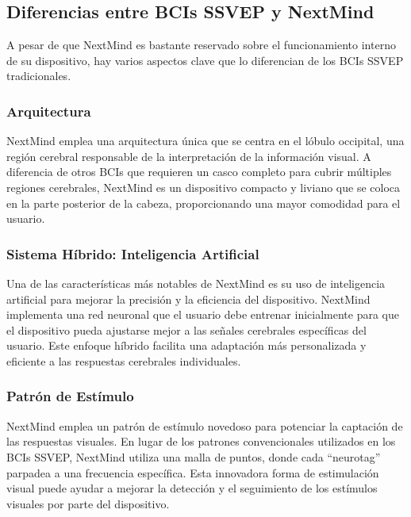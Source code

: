 \subsection{Diferencias entre BCIs SSVEP y NextMind}

A pesar de que NextMind es bastante reservado sobre el funcionamiento interno de su dispositivo, hay varios aspectos clave que lo diferencian de los BCIs SSVEP tradicionales.

\subsubsection{Arquitectura}

NextMind emplea una arquitectura única que se centra en el lóbulo occipital, una región cerebral responsable de la interpretación de la información visual. A diferencia de otros BCIs que requieren un casco completo para cubrir múltiples regiones cerebrales, NextMind es un dispositivo compacto y liviano que se coloca en la parte posterior de la cabeza, proporcionando una mayor comodidad para el usuario.

\subsubsection{Sistema Híbrido: Inteligencia Artificial}

Una de las características más notables de NextMind es su uso de inteligencia artificial para mejorar la precisión y la eficiencia del dispositivo. NextMind implementa una red neuronal que el usuario debe entrenar inicialmente para que el dispositivo pueda ajustarse mejor a las señales cerebrales específicas del usuario. Este enfoque híbrido facilita una adaptación más personalizada y eficiente a las respuestas cerebrales individuales.

\subsubsection{Patrón de Estímulo}

NextMind emplea un patrón de estímulo novedoso para potenciar la captación de las respuestas visuales. En lugar de los patrones convencionales utilizados en los BCIs SSVEP, NextMind utiliza una malla de puntos, donde cada ``neurotag'' parpadea a una frecuencia específica. Esta innovadora forma de estimulación visual puede ayudar a mejorar la detección y el seguimiento de los estímulos visuales por parte del dispositivo.



